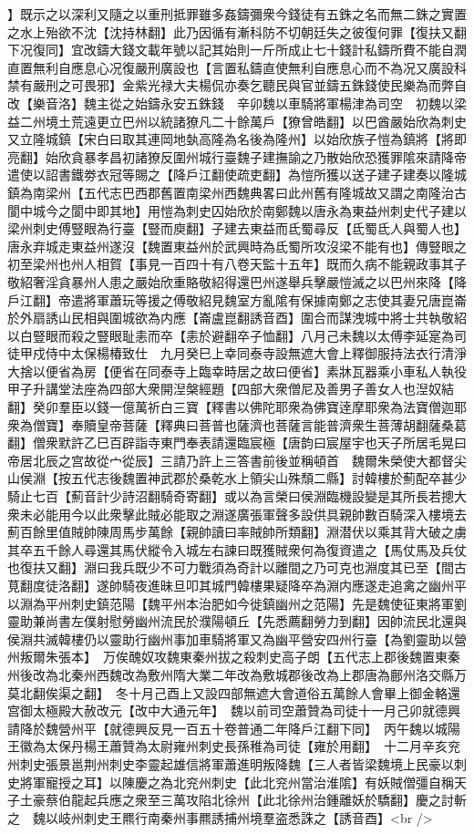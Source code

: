 】既示之以深利又隨之以重刑抵罪雖多姦鑄彌衆今錢徒有五銖之名而無二銖之實置之水上殆欲不沈【沈持林翻】此乃因循有漸科防不切朝廷失之彼復何罪【復扶又翻下况復同】宜改鑄大錢文載年號以記其始則一斤所成止七十錢計私鑄所費不能自潤直置無利自應息心况復嚴刑廣設也【言置私鑄直使無利自應息心而不為况又廣設科禁有嚴刑之可畏邪】金紫光禄大夫楊侃亦奏乞聽民與官並鑄五銖錢使民樂為而弊自改【樂音洛】魏主從之始鑄永安五銖錢　辛卯魏以車騎將軍楊津為司空　初魏以梁益二州境土荒遠更立巴州以統諸獠凡二十餘萬戶【獠曾皓翻】以巴酋嚴始欣為刺史又立隆城鎮【宋白曰取其連岡地埶高隆為名後為隆州】以始欣族子愷為鎮將【將即亮翻】始欣貪暴孝昌初諸獠反圍州城行臺魏子建撫諭之乃散始欣恐獲罪隂來請降帝遣使以詔書鐵劵衣冠等賜之【降戶江翻使疏吏翻】為愷所獲以送子建子建奏以隆城鎮為南梁州【五代志巴西郡舊置南梁州西魏典畧曰此州舊有隆城故又謂之南隆治古閬中城今之閬中即其地】用愷為刺史囚始欣於南鄭魏以唐永為東益州刺史代子建以梁州刺史傅豎眼為行臺【豎而庾翻】子建去東益而氐蜀尋反【氐蜀氐人與蜀人也】唐永弃城走東益州遂沒【魏置東益州於武興時為氐蜀所攻沒梁不能有也】傳豎眼之初至梁州也州人相賀【事見一百四十有八卷天監十五年】既而久病不能親政事其子敬紹奢淫貪暴州人患之嚴始欣重賂敬紹得還巴州遂舉兵擊嚴愷滅之以巴州來降【降戶江翻】帝遣將軍蕭玩等援之傅敬紹見魏室方亂隂有保據南鄭之志使其妻兄唐崑崙於外扇誘山民相與圍城欲為内應【崙盧崑翻誘音酉】圍合而謀洩城中將士共執敬紹以白豎眼而殺之豎眼耻恚而卒【恚於避翻卒子恤翻】八月己未魏以太傅李延寔為司徒甲戍侍中太保楊椿致仕　九月癸巳上幸同泰寺設無遮大會上釋御服持法衣行清淨大捨以便省為房【便省在同泰寺上臨幸時居之故曰便省】素牀瓦器乘小車私人執役甲子升講堂法座為四部大衆開湼槃經題【四部大衆僧尼及善男子善女人也湼奴結翻】癸卯羣臣以錢一億萬祈白三寶【釋書以佛陀耶衆為佛寶逹摩耶衆為法寶僧迦耶衆為僧寶】奉贖皇帝菩薩【釋典曰菩普也薩濟也菩薩言能普濟衆生菩薄胡翻薩桑葛翻】僧衆默許乙巳百辟詣寺東門奉表請還臨宸極【唐韵曰宸屋宇也天子所居毛晃曰帝居北辰之宫故從宀從辰】三請乃許上三答書前後並稱頓首　魏爾朱榮使大都督尖山侯淵【按五代志後魏置神武郡於桑乾水上領尖山殊頹二縣】討韓樓於薊配卒甚少騎止七百【薊音計少詩沼翻騎奇寄翻】或以為言榮曰侯淵臨機設變是其所長若摠大衆未必能用今以此衆擊此賊必能取之淵遂廣張軍聲多設供具親帥數百騎深入樓境去薊百餘里值賊帥陳周馬步萬餘【親帥讀曰率賊帥所類翻】淵潜伏以乘其背大破之虜其卒五千餘人尋還其馬伏縱令入城左右諫曰既獲賊衆何為復資遣之【馬仗馬及兵仗也復扶又翻】淵曰我兵既少不可力戰須為奇計以離間之乃可克也淵度其已至【間古莧翻度徒洛翻】遂帥騎夜進昧旦叩其城門韓樓果疑降卒為淵内應遂走追禽之幽州平以淵為平州刺史鎮范陽【魏平州本治肥如今徙鎮幽州之范陽】先是魏使征東將軍劉靈助兼尚書左僕射慰勞幽州流民於濮陽頓丘【先悉薦翻勞力到翻】因帥流民北還與侯淵共滅韓樓仍以靈助行幽州事加車騎將軍又為幽平營安四州行臺【為劉靈助以營州叛爾朱張本】　万俟醜奴攻魏東秦州拔之殺刺史高子朗【五代志上郡後魏置東秦州後改為北秦州西魏改為敷州隋大業二年改為敷城郡後改為上郡唐為鄜州洛交縣万莫北翻俟渠之翻】　冬十月己酉上又設四部無遮大會道俗五萬餘人會畢上御金輅還宫御太極殿大赦改元【改中大通元年】　魏以前司空蕭贊為司徒十一月己卯就德興請降於魏營州平【就德興反見一百五十卷普通二年降戶江翻下同】　丙午魏以城陽王徽為太保丹楊王蕭贊為太尉雍州刺史長孫稚為司徒【雍於用翻】　十二月辛亥兖州刺史張景邕荆州刺史李靈起雄信將軍蕭進明叛降魏【三人者皆梁魏境上民豪以刺史將軍寵授之耳】以陳慶之為北兖州刺史【此北兖州當治淮隂】有妖賊僧彊自稱天子土豪蔡伯龍起兵應之衆至三萬攻陷北徐州【此北徐州治鍾離妖於驕翻】慶之討斬之　魏以岐州刺史王羆行南秦州事羆誘捕州境羣盗悉誅之【誘音酉】<br />

